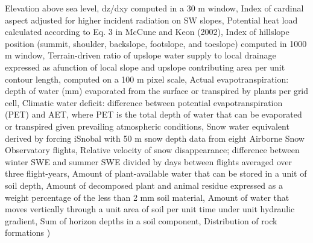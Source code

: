 \documentclass[
  12pt,
]{article}
\newenvironment{Shaded}{\begin{snugshade}}{\end{snugshade}}
\newcommand{\NormalTok}[1]{#1}
\newcommand{\StringTok}[1]{\textcolor[rgb]{0.31,0.60,0.02}{#1}}
\begin{document}
\begin{Shaded}
\begin{Highlighting}[]
            \StringTok{\textquotesingle{}Elevation above sea level\textquotesingle{}}\NormalTok{,}
            \StringTok{\textquotesingle{}dz/dxy computed in a 30 m window\textquotesingle{}}\NormalTok{,}
            \StringTok{\textquotesingle{}Index of cardinal aspect adjusted for higher incident radiation on SW slopes\textquotesingle{}}\NormalTok{,}
            \StringTok{\textquotesingle{}Potential heat load calculated according to Eq. 3 in McCune and Keon (2002)\textquotesingle{}}\NormalTok{,}
            \StringTok{\textquotesingle{}Index of hillslope position (summit, shoulder, backslope, footslope, and toeslope) computed in 1000 m window\textquotesingle{}}\NormalTok{,}
            \StringTok{\textquotesingle{}Terrain{-}driven ratio of upslope water supply to local drainage expressed as afunction of local slope and upslope contributing area per unit contour length, computed on a 100 m pixel scale\textquotesingle{}}\NormalTok{,}
            \StringTok{\textquotesingle{}Actual evapotranspiration: depth of water (mm) evaporated from the surface or transpired by plants per grid cell\textquotesingle{}}\NormalTok{,}
            \StringTok{\textquotesingle{}Climatic water deficit: difference between potential evapotranspiration (PET) and AET, where PET is the total depth of water that can be evaporated or transpired given prevailing atmospheric conditions\textquotesingle{}}\NormalTok{,}
            \StringTok{\textquotesingle{}Snow water equivalent derived by forcing iSnobal with 50 m snow depth data from eight Airborne Snow Observatory flights\textquotesingle{}}\NormalTok{,}
            \StringTok{\textquotesingle{}Relative velocity of snow disappearance; difference between winter SWE and summer SWE divided by days between flights averaged over three flight{-}years\textquotesingle{}}\NormalTok{,}
            \StringTok{\textquotesingle{}Amount of plant{-}available water that can be stored in a unit of soil depth\textquotesingle{}}\NormalTok{,}
            \StringTok{\textquotesingle{}Amount of decomposed plant and animal residue expressed as a weight percentage of the less than 2 mm soil material\textquotesingle{}}\NormalTok{,}
            \StringTok{\textquotesingle{}Amount of water that moves vertically through a unit area of soil per unit time under unit hydraulic gradient\textquotesingle{}}\NormalTok{,}
            \StringTok{\textquotesingle{}Sum of horizon depths in a soil component\textquotesingle{}}\NormalTok{,}
            \StringTok{\textquotesingle{}Distribution of rock formations\textquotesingle{}}
\NormalTok{            )}


\end{Highlighting}
\end{Shaded}
\end{document}
